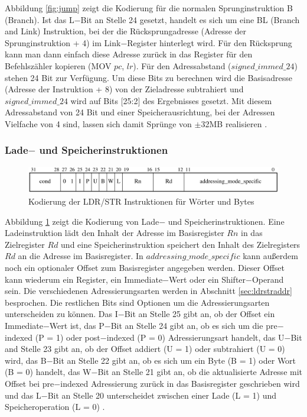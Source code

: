 \documentclass[a4paper, 11pt, onecolumn]{article}
\begin{document}
Abbildung \ref{fig:jump} zeigt die Kodierung für die normalen Sprunginstruktion B (Branch). Ist das L$-$Bit an Stelle 24 gesetzt, handelt es sich um eine BL (Branch and Link) Instruktion, bei der die Rücksprungadresse (Adresse der Sprunginstruktion + 4) im Link$-$Register hinterlegt wird. Für den Rücksprung kann man dann einfach diese Adresse zurück in das Register für den Befehlszähler kopieren (MOV $pc$, $lr$). Für den Adressabstand ($signed\_immed\_24$) stehen 24 Bit zur Verfügung. Um diese Bits zu berechnen wird die Basisadresse (Adresse der Instruktion + 8) von der Zieladresse subtrahiert und $signed\_immed\_24$ wird auf Bits $[$25:2$]$ des Ergebnisses gesetzt. Mit diesem Adressabstand von 24 Bit und einer Speicherausrichtung, bei der Adressen Vielfache von 4 sind, lassen sich damit Sprünge von $\pm$32MB realisieren \cite{arm:2005}.

\subsubsection{Lade$-$ und Speicherinstruktionen}

\begin{figure}[!htb]
\centering
\includegraphics[width=1\textwidth]{data/ldrstr}
\caption{Kodierung der LDR/STR Instruktionen für Wörter und Bytes \cite{arm:2005}}
\label{fig:ldrstr}
\end{figure}

Abbildung \ref{fig:ldrstr} zeigt die Kodierung von Lade$-$ und Speicherinstruktionen. Eine Ladeinstruktion lädt den Inhalt der Adresse im Basisregister $Rn$ in das Zielregister $Rd$ und eine Speicherinstruktion speichert den Inhalt des Zielregisters $Rd$ an die Adresse im Basisregister. In $addressing\_mode\_specific$ kann außerdem noch ein optionaler Offset zum Basisregister angegeben werden. Dieser Offset kann wiederum ein Register, ein Immediate$-$Wert oder ein Shifter$-$Operand sein. Die verschiedenen Adressierungsarten werden in Abschnitt \ref{sec:ldrstraddr} besprochen. Die restlichen Bits sind Optionen um die Adressierungsarten unterscheiden zu können. Das I$-$Bit an Stelle 25 gibt an, ob der Offset ein Immediate$-$Wert ist, das P$-$Bit an Stelle 24 gibt an, ob es sich um die pre$-$indexed (P = 1) oder post$-$indexed (P = 0) Adressierungsart handelt, das U$-$Bit and Stelle 23 gibt an, ob der Offset addiert (U = 1) oder subtrahiert (U = 0) wird, das B$-$Bit an Stelle 22 gibt an, ob es sich um ein Byte (B = 1) oder Wort (B = 0) handelt, das W$-$Bit an Stelle 21 gibt an, ob die aktualisierte Adresse mit Offset bei pre$-$indexed Adressierung zurück in das Basisregister geschrieben wird und das L$-$Bit an Stelle 20 unterscheidet zwischen einer Lade (L = 1) und Speicheroperation (L = 0) \cite{arm:2005}.
\end{document}
